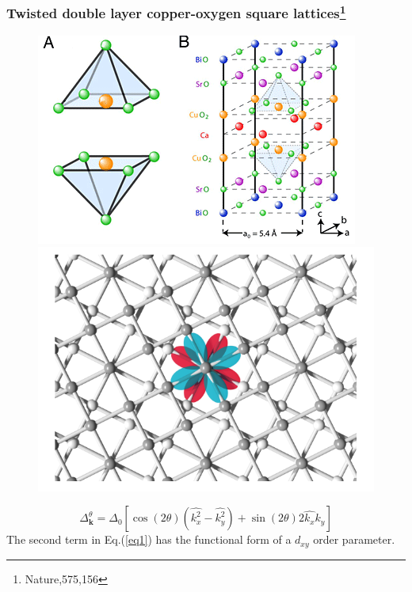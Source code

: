 \documentclass{beamer}
\begin{document}
\begin{frame}
\frametitle{Twisted double layer copper-oxygen square
	lattices\footnote{Nature,575,156}}
\begin{figure}
\centering
\includegraphics[scale=0.6]{pic/p3.png}
\includegraphics[scale=0.4]{pic/p1.png}
\end{figure}
\begin{equation}
\Delta_\mathbf{k}^\theta=\Delta_0\left[\cos(2\theta)(\hat{k_x^2}-\hat{k_y^2})+\sin(2\theta)2\hat{k_x}\hat{k_y}\right]\label{eq1}
\end{equation}
The second term in Eq.(\ref{eq1}) has the functional form of a $d_{xy}$ order parameter.
\end{frame}
\end{document}

